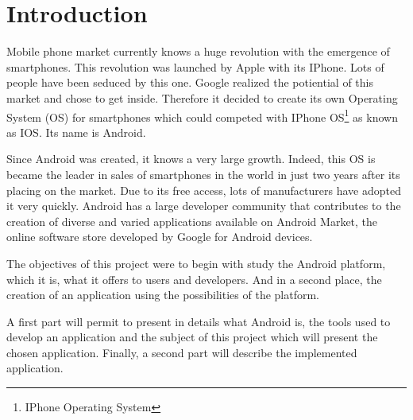 \chapter{Introduction}

Mobile phone market currently knows a huge revolution with the emergence of smartphones.
This revolution was launched by Apple with its IPhone. Lots of people have been seduced by this one.
Google realized the potiential of this market and chose to get inside.
Therefore it decided to create its own Operating System (OS) for smartphones which could competed with IPhone OS\protect\footnote{IPhone Operating System} as known as IOS.
Its name is Android.

\noindent Since Android was created, it knows a very large growth.
Indeed, this OS is became the leader in sales of smartphones in the world in just two years after its placing on the market.
Due to its free access, lots of manufacturers have adopted it very quickly.
Android has a large developer community that contributes to the creation of diverse and varied applications available on Android Market, the online software store developed by Google for Android devices.

\noindent The objectives of this project were to begin with study the Android platform, which it is, what it offers to users and developers.
And in a second place, the creation of an application using the possibilities of the platform.

\noindent A first part will permit to present in details what Android is, the tools used to develop an application and the subject of this project which will present the chosen application.
Finally, a second part will describe the implemented application.

\clearpage
